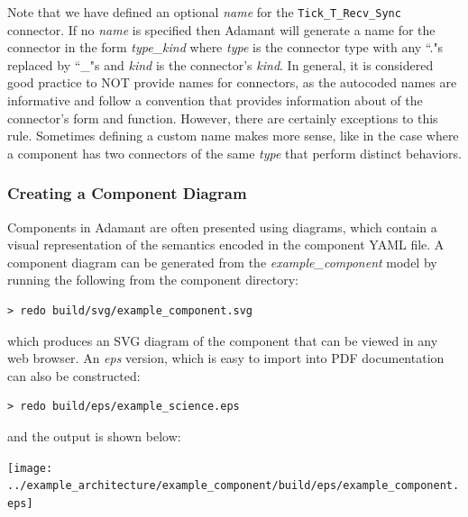 Note that we have defined an optional \textit{name} for the \texttt{Tick\_T\_Recv\_Sync} connector. If no \textit{name} is specified then Adamant will generate a name for the connector in the form \textit{type\_kind} where \textit{type} is the connector type with any ``."s replaced by ``\_"s and \textit{kind} is the connector's \textit{kind}. In general, it is considered good practice to NOT provide names for connectors, as the autocoded names are informative and follow a convention that provides information about of the connector's form and function. However, there are certainly exceptions to this rule. Sometimes defining a custom name makes more sense, like in the case where a component has two connectors of the same \textit{type} that perform distinct behaviors. \\

\subsubsection{Creating a Component Diagram} \label{Creating a Component Diagram}

Components in Adamant are often presented using diagrams, which contain a visual representation of the semantics encoded in the component YAML file. A component diagram can be generated from the \textit{example\_component} model by running the following from the component directory:

\vspace{5mm} %
\begin{verbatim}
> redo build/svg/example_component.svg
\end{verbatim}
\vspace{5mm} %

which produces an SVG diagram of the component that can be viewed in any web browser. An \textit{eps} version, which is easy to import into PDF documentation can also be constructed:

\vspace{5mm} %
\begin{verbatim}
> redo build/eps/example_science.eps
\end{verbatim}
\vspace{5mm} %

and the output is shown below:

\vspace{5mm} %
\texttt{[image: ../example\_architecture/example\_component/build/eps/example\_component.eps]}
\vspace{5mm} %

